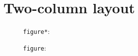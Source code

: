 \documentclass[twocolumn]{article}
\begin{document}
\section*{Two-column layout}
\lipsum[1]
\begin{figure}[t]\centering
  \caption{\texttt{figure*}: \texttt{\string\gnuplotfit[\string\textwidth][12\string\baselineskip]}}
\end{figure}
\begin{figure}[t]\centering
  \caption{\texttt{figure}: \texttt{\string\gnuplotfit[\string\linewidth][10\string\baselineskip]}}
\end{figure}
\lipsum[2-9]
\end{document}
